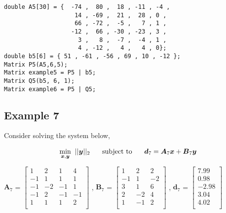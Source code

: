 \documentclass[a4paper]{article}
\begin{document}
\begin{verbatim}  
double A5[30] = {  -74 ,  80 ,  18 , -11 , -4 ,
                    14 , -69 ,  21 ,  28 , 0 , 
                    66 , -72 ,  -5 ,   7 , 1 ,
                   -12 ,  66 , -30 , -23 , 3 ,
                     3 ,   8 ,  -7 ,  -4 , 1 ,
                     4 , -12 ,   4 ,   4 , 0};
double b5[6] = { 51 , -61 , -56 , 69 , 10 , -12 };
Matrix P5(A5,6,5); 
Matrix example5 = P5 | b5;
Matrix Q5(b5, 6, 1);
Matrix example6 = P5 | Q5;
\end{verbatim}








\subsection{Example 7}

Consider solving the system below,

\begin{equation*}
\begin{aligned}
\underset{\boldsymbol{x},\boldsymbol{y}}{\min} \hspace{0.2cm} || \boldsymbol{y} ||_{2}  \hspace{0.5cm} \text{ subject to } \hspace{0.5cm}  \boldsymbol{d}_{7} = \boldsymbol{A}_{7}\boldsymbol{x} + \boldsymbol{B}_{7}\boldsymbol{y}
\end{aligned}
\end{equation*}



$\boldsymbol{A}_{7}$ = $\begin{bmatrix}
1 &  2 &  1 & 4  \\
-1 &  1 &  1 & 1  \\ 
-1 & -2 & -1 & 1  \\ 
-1 &  2 & -1 & -1 \\ 
1 &  1 &  1 & 2 \\
\end{bmatrix}$ 
\hspace{0.5cm} , \hspace{0.5cm} 
$\boldsymbol{B}_{7}$ = $\begin{bmatrix}
1 &  2 & 2 \\
-1 &  1 & -2 \\ 
3 &  1 & 6 \\
2 & -2 & 4 \\
1 & -1 & 2\\
\end{bmatrix}$ 
\hspace{0.5cm} , \hspace{0.5cm}  
$\boldsymbol{d}_{7}$ = $\begin{bmatrix}
7.99 \\
0.98 \\
-2.98 \\
3.04 \\
4.02 \\
\end{bmatrix}$ 
\end{document}

